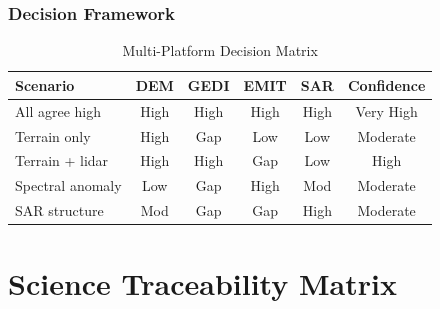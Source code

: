 \documentclass[11pt,letterpaper]{article}
\begin{document}
\subsubsection{Decision Framework}

\begin{table}[h]
\centering
\caption{Multi-Platform Decision Matrix}
\label{tab:decision_matrix}
\begin{tabular}{lccccc}
\toprule
\textbf{Scenario} & \textbf{DEM} & \textbf{GEDI} & \textbf{EMIT} & \textbf{SAR} & \textbf{Confidence} \\
\midrule
All agree high & High & High & High & High & Very High \\
Terrain only & High & Gap & Low & Low & Moderate \\
Terrain + lidar & High & High & Gap & Low & High \\
Spectral anomaly & Low & Gap & High & Mod & Moderate \\
SAR structure & Mod & Gap & Gap & High & Moderate \\
\bottomrule
\end{tabular}
\end{table}

\section{Science Traceability Matrix}
\label{sec:stm}
\end{document}
